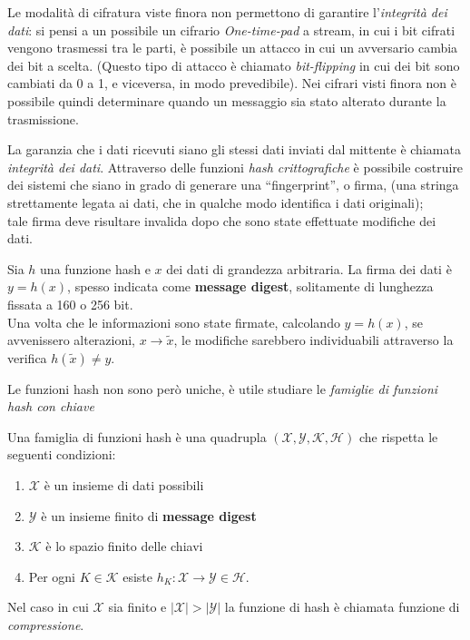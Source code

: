 Le modalità di cifratura viste finora non permettono di garantire l'\emph{integrità dei dati}: si pensi a un possibile un cifrario \emph{One-time-pad} a stream, in cui i bit cifrati vengono trasmessi tra le parti, è possibile un attacco in cui un avversario cambia dei bit a scelta. (Questo tipo di attacco è chiamato \emph{bit-flipping} in cui dei bit sono cambiati da 0 a 1, e viceversa, in modo prevedibile). Nei cifrari visti finora non è possibile quindi determinare quando un messaggio sia stato alterato durante la trasmissione.

\vspace{0.2cm} \noindent La garanzia che i dati ricevuti siano gli stessi dati inviati dal mittente è chiamata \emph{integrità dei dati}. Attraverso delle funzioni \emph{hash crittografiche} è possibile costruire dei sistemi che siano in grado di generare una ``fingerprint'', o firma, (una stringa strettamente legata ai dati, che in qualche modo identifica i dati originali); \\ tale firma deve risultare invalida dopo che sono state effettuate modifiche dei dati. 

\vspace{1em} \noindent Sia $h$ una funzione hash e $x$ dei dati di grandezza arbitraria. La firma dei dati è $y = h(x)$, spesso indicata come \textbf{message digest}, solitamente di lunghezza fissata a 160 o 256 bit. \\ Una volta che le informazioni sono state firmate, calcolando $y = h(x)$, se avvenissero alterazioni, $x \to \tilde{x}$, le modifiche sarebbero individuabili attraverso la verifica $h(\tilde{x}) \neq y$.

\vspace{2em} \noindent Le funzioni hash non sono però uniche, è utile studiare le \emph{famiglie di funzioni hash con chiave}
\begin{definition}
    Una famiglia di funzioni hash è una quadrupla $(\mathcal{X},\mathcal{Y},\mathcal{K},\mathcal{H})$ che rispetta le seguenti condizioni:
    
    \begin{enumerate}
        \item $\mathcal{X}$ è un insieme di dati possibili
        \item $\mathcal{Y}$ è un insieme finito di \textbf{message digest}
        \item $\mathcal{K}$ è lo spazio finito delle chiavi
        \item Per ogni $K \in \mathcal{K}$ esiste $h_K: \mathcal{X} \to \mathcal{Y} \in \mathcal{H}$.
    \end{enumerate}
    Nel caso in cui $\mathcal{X}$ sia finito e $|\mathcal{X}| > |\mathcal{Y}|$ la funzione di hash è chiamata funzione di \emph{compressione}.
\end{definition}


